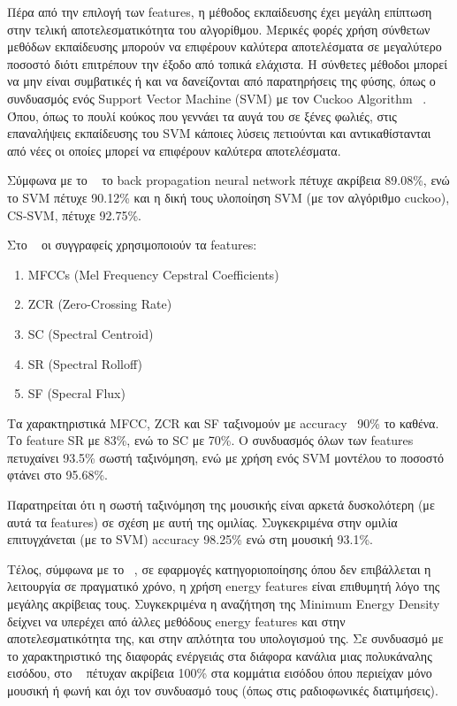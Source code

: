 \vspace{1em}
Πέρα από την επιλογή των features, η μέθοδος εκπαίδευσης έχει μεγάλη επίπτωση στην
τελική αποτελεσματικότητα του αλγορίθμου. Μερικές φορές χρήση σύνθετων μεθόδων
εκπαίδευσης μπορούν να επιφέρουν καλύτερα αποτελέσματα σε μεγαλύτερο ποσοστό
διότι επιτρέπουν την έξοδο από τοπικά ελάχιστα. Η σύνθετες μέθοδοι μπορεί να μην
είναι συμβατικές ή και να δανείζονται από παρατηρήσεις της φύσης, όπως ο
συνδυασμός ενός Support Vector Machine (SVM) με τον Cuckoo Algorithm ~\cite{cuckoo}.
Όπου, όπως το πουλί κούκος που γεννάει τα αυγά του σε ξένες φωλιές, στις
επαναλήψεις εκπαίδευσης του SVM κάποιες λύσεις πετιούνται και αντικαθίστανται από
νέες οι οποίες μπορεί να επιφέρουν καλύτερα αποτελέσματα.

Σύμφωνα με το ~\cite{cuckoo} το back propagation neural network πέτυχε ακρίβεια
89.08\%, ενώ το SVM πέτυχε 90.12\% και η δική τους υλοποίηση SVM (με τον
αλγόριθμο cuckoo), CS-SVM, πέτυχε 92.75\%.

\vspace{1em}
Στο ~\cite{hybrid} οι συγγραφείς χρησιμοποιούν τα features:
\begin{enumerate}[noitemsep]
\item ΜFCCs (Mel Frequency Cepstral Coefficients)
\item ZCR (Zero-Crossing Rate)
\item SC (Spectral Centroid)
\item SR (Spectral Rolloff)
\item SF (Specral Flux)
\end{enumerate}

Τα χαρακτηριστικά ΜFCC, ZCR και SF ταξινομούν με accuracy ~90\% το καθένα. Το
feature SR με 83\%, ενώ το SC με 70\%. Ο συνδυασμός όλων των features πετυχαίνει
93.5\% σωστή ταξινόμηση, ενώ με χρήση ενός SVM μοντέλου το ποσοστό φτάνει στο
95.68\%.

Παρατηρείται ότι η σωστή ταξινόμηση της μουσικής είναι αρκετά δυσκολότερη (με
αυτά τα features) σε σχέση με αυτή της ομιλίας. Συγκεκριμένα στην ομιλία
επιτυγχάνεται (με το SVM) accuracy 98.25\% ενώ στη μουσική 93.1\%.

\vspace{1em}
Τέλος, σύμφωνα με το ~\cite{radio}, σε εφαρμογές κατηγοριοποίησης όπου δεν
επιβάλλεται η λειτουργία σε πραγματικό χρόνο, η χρήση energy features είναι
επιθυμητή λόγο της μεγάλης ακρίβειας τους. Συγκεκριμένα η αναζήτηση της Minimum
Energy Density δείχνει να υπερέχει από άλλες μεθόδους energy features και στην
αποτελεσματικότητα της, και στην απλότητα του υπολογισμού της. Σε συνδυασμό με το
χαρακτηριστικό της διαφοράς ενέργειάς στα διάφορα κανάλια μιας πολυκάναλης
εισόδου, στο ~\cite{radio} πέτυχαν ακρίβεια 100\% στα κομμάτια εισόδου όπου
περιείχαν μόνο μουσική ή φωνή και όχι τον συνδυασμό τους (όπως στις ραδιοφωνικές
διατιμήσεις).
